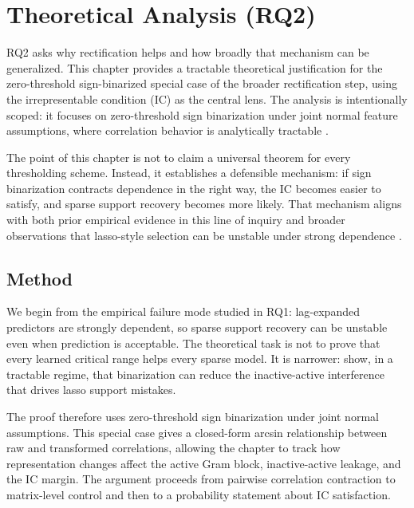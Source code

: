 
\chapter{Theoretical Analysis (RQ2)}

RQ2 asks why rectification helps and how broadly that mechanism can be generalized. This chapter provides a tractable theoretical justification for the zero-threshold sign-binarized special case of the broader rectification step, using the irrepresentable condition (IC) as the central lens. The analysis is intentionally scoped: it focuses on zero-threshold sign binarization under joint normal feature assumptions, where correlation behavior is analytically tractable \autocites{PZhao2006model,JOrender2025Efficient}.

The point of this chapter is not to claim a universal theorem for every thresholding scheme. Instead, it establishes a defensible mechanism: if sign binarization contracts dependence in the right way, the IC becomes easier to satisfy, and sparse support recovery becomes more likely. That mechanism aligns with both prior empirical evidence in this line of inquiry and broader observations that lasso-style selection can be unstable under strong dependence \autocites{freijeirogonzalez2022,JOrender2025Efficient}.

\section{Method}

We begin from the empirical failure mode studied in RQ1: lag-expanded predictors are strongly dependent, so sparse support recovery can be unstable even when prediction is acceptable. The theoretical task is not to prove that every learned critical range helps every sparse model. It is narrower: show, in a tractable regime, that binarization can reduce the inactive-active interference that drives lasso support mistakes.

The proof therefore uses zero-threshold sign binarization under joint normal assumptions. This special case gives a closed-form arcsin relationship between raw and transformed correlations, allowing the chapter to track how representation changes affect the active Gram block, inactive-active leakage, and the IC margin. The argument proceeds from pairwise correlation contraction to matrix-level control and then to a probability statement about IC satisfaction.

